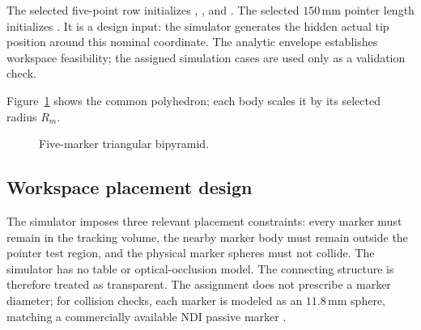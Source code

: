\documentclass[11pt]{article}
\begin{document}
The selected five-point row initializes ,
, and .  The selected
$150\,\mathrm{mm}$ pointer length initializes .  It is a
design input: the simulator generates the hidden actual tip position around
this nominal coordinate.  The analytic envelope establishes workspace
feasibility; the assigned simulation cases are used only as a validation
check.

Figure~\ref{fig:marker-geometry-design} shows the common polyhedron; each body
scales it by its selected radius $R_m$.

\begin{figure}[H]
\centering
{}
\caption{Five-marker triangular bipyramid.}
\label{fig:marker-geometry-design}
\end{figure}

\subsection{Workspace placement design}
The simulator imposes three relevant placement constraints: every marker must
remain in the tracking volume, the nearby marker body must remain outside the
pointer test region, and the physical marker spheres must not collide.  The
simulator has no table or optical-occlusion model.  The connecting structure is
therefore treated as transparent.  The assignment does not prescribe a marker
diameter; for collision checks, each marker is modeled as an
$11.8\,\mathrm{mm}$ sphere, matching a commercially available NDI passive
marker \cite{ndiSphere}.
\end{document}
